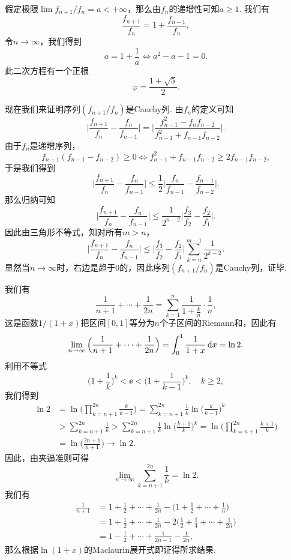 \begin{ans}
  假定极限$\lim f_{n+1}/f_n=a<+\infty$，那么由$f_n$的递增性可知$a\ge1$. 我们有
  \[ \frac{f_{n+1}}{f_n} = 1 + \frac{f_{n-1}}{f_n}, \]
  令$n\to\infty$，我们得到
  \[ a=1+\frac1a\Leftrightarrow a^2-a-1=0. \]
  此二次方程有一个正根
  \[ \varphi=\frac{1+\sqrt5}2. \]

  现在我们来证明序列$(f_{n+1}/f_n)$是Cauchy列. 由$f_n$的定义可知
  \[
    \bigg| \frac{f_{n+1}}{f_n}-\frac{f_n}{f_{n-1}} \bigg| =
    \bigg| \frac{f_{n-1}^2-f_nf_{n-2}}{f_{n-1}^2+f_{n-1}
    f_{n-2}} \bigg|.
  \]
  由于$f_n$是递增序列，
  \[ f_{n-1}(f_{n-1}-f_{n-2})\ge0
  \Leftrightarrow f_{n-1}^2+f_{n-1}f_{n-2}\ge2f_{n-1}f_{n-2}, \]
  于是我们得到
  \[
  \bigg| \frac{f_{n+1}}{f_n}-\frac{f_n}{f_{n-1}} \bigg| \le
  \frac12\bigg| \frac{f_n}{f_{n-1}}-\frac{f_{n-1}}{f_{n-2}}
  \bigg|.
  \]
  那么归纳可知
  \[
  \bigg| \frac{f_{n+1}}{f_n}-\frac{f_n}{f_{n-1}} \bigg| \le
  \frac1{2^{n-2}}\bigg| \frac{f_3}{f_2}-\frac{f_2}{f_1}\bigg|.
  \]
  因此由三角形不等式，知对所有$m>n$，
  \[
  \bigg| \frac{f_{n+1}}{f_n}-\frac{f_n}{f_{n-1}} \bigg| \le
  \bigg| \frac{f_3}{f_2}-\frac{f_2}{f_1}  \bigg|
  \sum_{k=n}^{m-1}\frac1{2^{k-2}}.
  \]
  显然当$n\to\infty$时，右边是趋于0的，因此序列$(f_{n+1}/f_n)$是Cauchy列，证毕.
\end{ans}

\begin{ans}
  \method 我们有
  \[
    \frac1{n+1}+\cdots+\frac1{2n}=\sum_{k=1}^n\frac1{1+\frac kn}\cdot\frac1n,
  \]
  这是函数$1/(1+x)$把区间$[0,1]$等分为$n$个子区间的Riemann和，因此有
  \[
  \lim_{n\to\infty}\Big(\frac1{n+1}+\cdots+\frac1{2n}\Big)
  =\int_0^1\frac1{1+x}\,\dx = \ln2.
  \]
  \method 利用不等式
  \[
    \Big(1+\frac1k\Big)^k<\ee<\Big(1+\frac1{k-1}\Big)^k,
    \quad k\ge2,
  \]
  我们得到
  \begin{align*}
    \ln2 & = \ln\bigg(\prod_{k=n+1}^{2n}\frac k{k-1}\bigg)
     = \sum_{k=n+1}^{2n}\frac 1k\ln\Big(\frac k{k-1}\Big)^k\\
     & > \sum_{k=n+1}^{2n}\frac 1k>\sum_{k=n+1}^{2n}
     \frac 1k\ln\Big(\frac{k+1}k\Big)^k=
     \ln\bigg(\prod_{k=n+1}^{2n}\frac{k+1}k\bigg)\\
     & = \ln \Big(\frac{2n+1}{n+1}\Big)\to\ln2.
  \end{align*}
  因此，由夹逼准则可得
  \[ \lim_{n\to\infty}\sum_{k=n+1}^{2n}\frac1k=\ln2. \]
  \method 我们有
  \begin{align*}
    \frac1{n+1} & = 1+\frac12+\cdots+\frac1{2n}-
      \Big(1+\frac12+\cdots+\frac1n\Big)\\
      & = 1+\frac12+\cdots+\frac1{2n}-2
      \Big(\frac12+\frac14+\cdots+\frac1{2n}\Big)\\
      & = 1-\frac12+\cdots+\frac1{2n-1}-\frac1{2n},
  \end{align*}
  那么根据$\ln(1+x)$的Maclaurin展开式即证得所求结果.
\end{ans}

